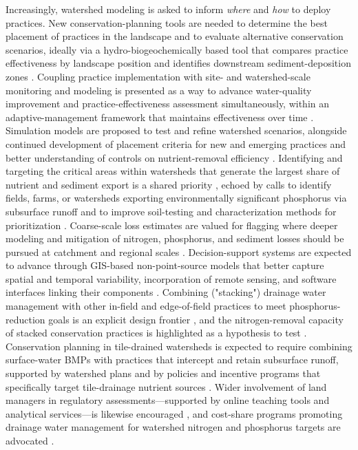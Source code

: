 \documentclass[11pt]{article}
\begin{document}
Increasingly, watershed modeling is asked to inform \emph{where} and \emph{how} to deploy practices. New conservation-planning tools are needed to determine the best placement of practices in the landscape and to evaluate alternative conservation scenarios, ideally via a hydro-biogeochemically based tool that compares practice effectiveness by landscape position and identifies downstream sediment-deposition zones \parencite{Kröger2013}. Coupling practice implementation with site- and watershed-scale monitoring and modeling is presented as a way to advance water-quality improvement and practice-effectiveness assessment simultaneously, within an adaptive-management framework that maintains effectiveness over time \parencite{Kröger2013}. Simulation models are proposed to test and refine watershed scenarios, alongside continued development of placement criteria for new and emerging practices and better understanding of controls on nutrient-removal efficiency \parencite{Tomer2015}. Identifying and targeting the critical areas within watersheds that generate the largest share of nutrient and sediment export is a shared priority \parencite{Lemke2011}, echoed by calls to identify fields, farms, or watersheds exporting environmentally significant phosphorus via subsurface runoff and to improve soil-testing and characterization methods for prioritization \parencite{Sims1998}. Coarse-scale loss estimates are valued for flagging where deeper modeling and mitigation of nitrogen, phosphorus, and sediment losses should be pursued at catchment and regional scales \parencite{McDowell2021}. Decision-support systems are expected to advance through GIS-based non-point-source models that better capture spatial and temporal variability, incorporation of remote sensing, and software interfaces linking their components \parencite{Djodjic2002}. Combining ("stacking") drainage water management with other in-field and edge-of-field practices to meet phosphorus-reduction goals is an explicit design frontier \parencite{King2022}, and the nitrogen-removal capacity of stacked conservation practices is highlighted as a hypothesis to test \parencite{Roley2016}. Conservation planning in tile-drained watersheds is expected to require combining surface-water BMPs with practices that intercept and retain subsurface runoff, supported by watershed plans and by policies and incentive programs that specifically target tile-drainage nutrient sources \parencite{Lemke2011}. Wider involvement of land managers in regulatory assessments---supported by online teaching tools and analytical services---is likewise encouraged \parencite{Stutter2018}, and cost-share programs promoting drainage water management for watershed nitrogen and phosphorus targets are advocated \parencite{Sunohara2015}.
\end{document}
